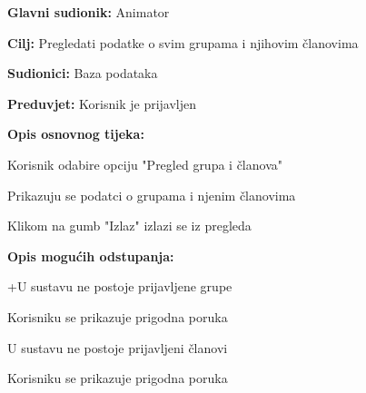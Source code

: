 					\noindent {}
					\begin{packed_item}
						
						\item \textbf{Glavni sudionik: }Animator
						\item  \textbf{Cilj:} Pregledati podatke o svim grupama i njihovim članovima
						\item  \textbf{Sudionici:} Baza podataka
						\item  \textbf{Preduvjet:} Korisnik je prijavljen
						\item  \textbf{Opis osnovnog tijeka:}
						
						\item[] \begin{packed_enum}
							
							\item Korisnik odabire opciju "Pregled grupa i članova"
							\item Prikazuju se podatci o grupama i njenim članovima
							\item Klikom na gumb "Izlaz" izlazi se iz pregleda
						\end{packed_enum}
						
						\item  \textbf{Opis mogućih odstupanja:}
						
						\item[] \begin{packed_item}
							
							\item[2.a] +U sustavu ne postoje prijavljene grupe
							\item[] \begin{packed_enum}
								
								\item Korisniku se prikazuje prigodna poruka
								
							\end{packed_enum}
							\item[2.b] U sustavu ne postoje prijavljeni članovi
							\item[] \begin{packed_enum}
								
								\item Korisniku se prikazuje prigodna poruka
								
							\end{packed_enum}
							
						\end{packed_item}
					\end{packed_item}
				
